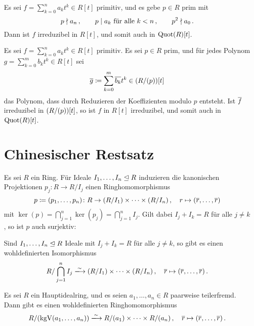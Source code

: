 \begin{proposition}[Eisenstein]
  Es sei $f = \sum_{k=0}^n a_k t^k \in R[t]$ primitiv, und es gebe $p \in R$ prim mit
  \[
    p \mathrel{\nmid} a_n \,,
    \qquad
    \text{$p \mathrel{|} a_k$ für alle $k < n$} \,,
    \qquad
    p^2 \mathrel{\nmid} a_0 \,.
  \]
  Dann ist $f$ irreduzibel in $R[t]$, und somit auch in $\operatorname{Quot}(R)[t]$.
\end{proposition}

\begin{proposition}[Reduktionskriterium]
  Es sei $f = \sum_{k=0}^n a_k t^k \in R[t]$ primitiv.
  Es sei $p \in R$ prim, und für jedes Polynom $g = \sum_{k=0}^m b_k t^k \in R[t]$ sei
  \[
              \overline{g}
    \coloneqq  \sum_{k=0}^m \overline{b_k} t^k
    \in       (R/(p))[t]
  \]
  das Polynom, dass durch Reduzieren der Koeffizienten modulo $p$ entsteht.
  Ist $\overline{f}$ irreduzibel in $(R/(p))[t]$, so ist $f$ in $R[t]$ irreduzibel, und somit auch in $\operatorname{Quot}(R)[t]$.
\end{proposition}







\section{Chinesischer Restsatz}

Es sei $R$ ein Ring.
Für Ideale $I_1, \dotsc, I_n \mathrel{\trianglelefteq} R$ induzieren die kanonischen Projektionen $p_j \colon R \to R/I_j$ einen Ringhomomorphismus
\[
            p
  \coloneqq  (p_1, \dotsc, p_n)
  \colon    R
  \to       (R/I_1) \times \dotsb \times (R/I_n) \,,
  \quad     r
  \mapsto   (\overline{r}, \dotsc, \overline{r})
\]
mit $\ker(p) = \bigcap_{j=1}^n \ker(p_j) = \bigcap_{j=1}^n I_j$.
Gilt dabei $I_j + I_k = R$ für alle $j \neq k$, so ist $p$ auch surjektiv:

\begin{theorem}
  Sind $I_1, \dotsc, I_n \mathrel{\trianglelefteq} R$ Ideale mit $I_j + I_k = R$ für alle $j \neq k$, so gibt es einen wohldefinierten Isomorphismus
  \[
                            R / \bigcap_{j=1}^n I_j
    \xlongrightarrow{\sim}  (R/I_1) \times \dotsb \times (R/I_n) \,,
    \quad                   \class{r}
    \mapsto                 (\class{r}, \dotsc, \class{r}) \,.
  \]
\end{theorem}

\begin{corollary}
  Es sei $R$ ein Hauptidealring, und es seien $a_1, \dotsc, a_n \in R$ paarweise teilerfremd.
  Dann gibt es einen wohldefinierten Ringhomomorphismus
  \[
                            R/\genideal{\kgV(a_1, \dotsc, a_n)}
    \xlongrightarrow{\sim}  R/\genideal{a_1} \times \dotsb \times R/\genideal{a_n} \,,
    \quad                   \class{r}
    \mapsto                 ( \class{r}, \dotsc, \class{r} ) \,.
  \]
\end{corollary}

